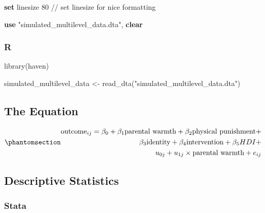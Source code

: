 \documentclass[
  letterpaper,
  DIV=11,
  numbers=noendperiod]{scrreprt}
\newenvironment{Shaded}{\begin{snugshade}}{\end{snugshade}}
\newcommand{\CommentTok}[1]{\textcolor[rgb]{0.37,0.37,0.37}{#1}}
\newcommand{\DecValTok}[1]{\textcolor[rgb]{0.68,0.00,0.00}{#1}}
\newcommand{\FunctionTok}[1]{\textcolor[rgb]{0.28,0.35,0.67}{#1}}
\newcommand{\KeywordTok}[1]{\textcolor[rgb]{0.00,0.23,0.31}{\textbf{#1}}}
\newcommand{\NormalTok}[1]{\textcolor[rgb]{0.00,0.23,0.31}{#1}}
\newcommand{\OtherTok}[1]{\textcolor[rgb]{0.00,0.23,0.31}{#1}}
\newcommand{\StringTok}[1]{\textcolor[rgb]{0.13,0.47,0.30}{#1}}
\begin{document}
\begin{Shaded}
\begin{Highlighting}[]

\KeywordTok{set} \DecValTok{linesize}\NormalTok{ 80 }\CommentTok{// set linesize for nice formatting}

\KeywordTok{use} \StringTok{"simulated\_multilevel\_data.dta"}\NormalTok{, }\KeywordTok{clear}
\end{Highlighting}
\end{Shaded}

\subsubsection{R}

\begin{Shaded}
\begin{Highlighting}[]
\FunctionTok{library}\NormalTok{(haven)}

\NormalTok{simulated\_multilevel\_data }\OtherTok{\textless{}{-}} \FunctionTok{read\_dta}\NormalTok{(}\StringTok{"simulated\_multilevel\_data.dta"}\NormalTok{)}
\end{Highlighting}
\end{Shaded}

\subsection{The Equation}\label{the-equation}

\begin{equation}\protect\phantomsection\label{eq-crosssectional}{\begin{aligned}
\text{outcome}_{ij} = \beta_0 + \beta_1 \text{parental warmth} + \beta_2 \text{physical punishment} + \\ \beta_3 \text{identity} + \beta_4 \text{intervention} + \beta_5 HDI + \\ u_{0j} + u_{1j} \times \text{parental warmth} + e_{ij} 
\end{aligned}}\end{equation}

\subsection{Descriptive Statistics}\label{descriptive-statistics}

\subsubsection{Stata}
\end{document}
